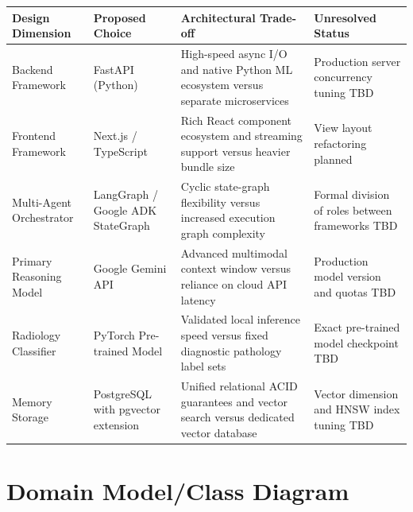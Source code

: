\begin{reporttable}
\centering
\small
\caption{Architectural design decisions, supported choices, trade-offs and unresolved options .}
\label{tab:esha:decisions}
\begin{tabular}{|p{}|p{}|p{}|p{}|}
\hline
Design Dimension & Proposed Choice & Architectural Trade-off & Unresolved Status \\ \hline
Backend Framework & FastAPI (Python) & High-speed async I/O and native Python ML ecosystem versus separate microservices & Production server concurrency tuning TBD \\ \hline
Frontend Framework & Next.js / TypeScript & Rich React component ecosystem and streaming support versus heavier bundle size & View layout refactoring planned \\ \hline
Multi-Agent Orchestrator & LangGraph / Google ADK StateGraph & Cyclic state-graph flexibility versus increased execution graph complexity & Formal division of roles between frameworks TBD \\ \hline
Primary Reasoning Model & Google Gemini API & Advanced multimodal context window versus reliance on cloud API latency & Production model version and quotas TBD \\ \hline
Radiology Classifier & PyTorch Pre-trained Model & Validated local inference speed versus fixed diagnostic pathology label sets & Exact pre-trained model checkpoint TBD \\ \hline
Memory Storage & PostgreSQL with pgvector extension & Unified relational ACID guarantees and vector search versus dedicated vector database & Vector dimension and HNSW index tuning TBD \\ \hline
\end{tabular}
\end{reporttable}


\section{Domain Model/Class Diagram}

